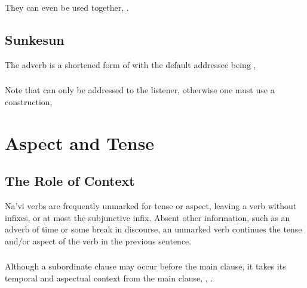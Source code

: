 \subsubsection{} They can even be used together,  .

\subsection{Sunkesun} The adverb   is a shortened form of  with the default addressee being ,  

\subsubsection{} Note that  can only be addressed to the listener, otherwise one must use a  construction,  

\section{Aspect and Tense}

\subsection{The Role of Context} Na'vi verbs are frequently unmarked
for tense or aspect, leaving a verb without infixes, or at most the
subjunctive infix.  Absent other information, such as an adverb of
time or some break in discourse, an unmarked verb continues the tense
and/or aspect of the verb in the previous sentence.

\subsubsection{} Although a subordinate clause may occur before the
main clause, it takes its temporal and aspectual context from the main
clause,  ,  .

